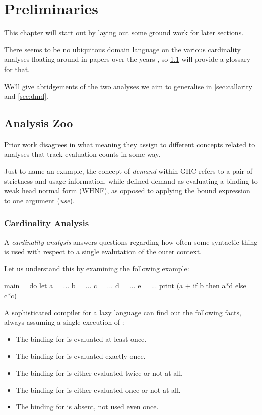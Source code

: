 \chapter{Preliminaries}\label{sec:prel}

This chapter will start out by laying out some ground work for later sections.

There seems to be no ubiquitous domain language on the various cardinality analyses floating around in papers over the years \parencite{projimpl,verstoepthesis,sestoft,sharing,updabs,callarity,warnsbrough,dmd,card}, so \cref{sec:zoo} will provide a glossary for that.

We'll give abridgements of the two analyses we aim to generalise in \cref{sec:callarity} and \cref{sec:dmd}.

\section{Analysis Zoo}\label{sec:zoo}

Prior work disagrees in what meaning they assign to different concepts related to analyses that track evaluation counts in some way.

Just to name an example, the concept of \emph{demand} within GHC refers to a pair of strictness and usage information, while \textcite[Appendix~C.2]{warnsbrough} defined demand as evaluating a binding to weak head normal form (WHNF), as opposed to applying the bound expression to one argument (\emph{use}).

\subsection{Cardinality Analysis}\label{sec:card}

A \emph{cardinality analysis} answers questions regarding how often some syntactic thing is used with respect to a single evalutation of the outer context.

Let us understand this by examining the following example:

\begin{haskellcode}
  main = do
    let a = ...
        b = ...
        c = ...
        d = ...
        e = ...
    print (a + if b then a*d else c*c)
\end{haskellcode}

A sophisticated compiler for a lazy language can find out the following facts, always assuming a single execution of :
\begin{itemize}
  \item The binding for  is evaluated at least once.
  \item The binding for  is evaluated exactly once.
  \item The binding for  is either evaluated twice or not at all.
  \item The binding for  is either evaluated once or not at all.
  \item The binding for  is absent, \eg not used even once.
\end{itemize}

